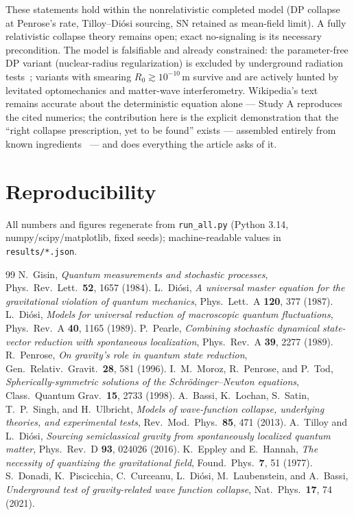 \documentclass[11pt,a4paper]{article}
\begin{document}
\noindent These statements hold within the nonrelativistic completed model (DP collapse at
Penrose's rate, Tilloy--Di\'osi sourcing, SN retained as mean-field limit). A fully
relativistic collapse theory remains open; exact no-signaling is its necessary
precondition. The model is falsifiable and already constrained: the parameter-free DP
variant (nuclear-radius regularization) is excluded by underground radiation
tests~\cite{donadi21}; variants with smearing
$R_0 \gtrsim 10^{-10}\,$m survive and are actively hunted by levitated optomechanics and
matter-wave interferometry. Wikipedia's text remains accurate about the deterministic
equation alone --- Study A reproduces the cited numerics; the contribution here is the
explicit demonstration that the ``right collapse prescription, yet to be found'' exists ---
assembled entirely from known ingredients~\cite{gisin84,diosi87,pearle89,tilloy16} --- and
does everything the article asks of it.

\section*{Reproducibility}
All numbers and figures regenerate from \texttt{run\_all.py}
(Python 3.14, numpy/scipy/matplotlib, fixed seeds); machine-readable values in
\texttt{results/*.json}.

\begin{thebibliography}{99}
 N.~Gisin, \textit{Quantum measurements and stochastic processes},
  Phys.\ Rev.\ Lett.\ \textbf{52}, 1657 (1984).
 L.~Di\'osi, \textit{A universal master equation for the gravitational
  violation of quantum mechanics}, Phys.\ Lett.\ A \textbf{120}, 377 (1987).
 L.~Di\'osi, \textit{Models for universal reduction of macroscopic
  quantum fluctuations}, Phys.\ Rev.\ A \textbf{40}, 1165 (1989).
 P.~Pearle, \textit{Combining stochastic dynamical state-vector
  reduction with spontaneous localization}, Phys.\ Rev.\ A \textbf{39}, 2277 (1989).
 R.~Penrose, \textit{On gravity's role in quantum state reduction},
  Gen.\ Relativ.\ Gravit.\ \textbf{28}, 581 (1996).
 I.~M.~Moroz, R.~Penrose, and P.~Tod, \textit{Spherically-symmetric
  solutions of the Schr\"odinger--Newton equations}, Class.\ Quantum Grav.\ \textbf{15},
  2733 (1998).
 A.~Bassi, K.~Lochan, S.~Satin, T.~P.~Singh, and H.~Ulbricht,
  \textit{Models of wave-function collapse, underlying theories, and experimental tests},
  Rev.\ Mod.\ Phys.\ \textbf{85}, 471 (2013).
 A.~Tilloy and L.~Di\'osi, \textit{Sourcing semiclassical gravity from
  spontaneously localized quantum matter}, Phys.\ Rev.\ D \textbf{93}, 024026 (2016).
 K.~Eppley and E.~Hannah, \textit{The necessity of quantizing the
  gravitational field}, Found.\ Phys.\ \textbf{7}, 51 (1977).
 S.~Donadi, K.~Piscicchia, C.~Curceanu, L.~Di\'osi, M.~Laubenstein, and
  A.~Bassi, \textit{Underground test of gravity-related wave function collapse},
  Nat.\ Phys.\ \textbf{17}, 74 (2021).
\end{thebibliography}
\end{document}
